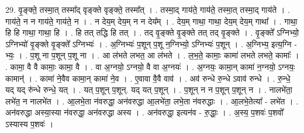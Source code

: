 \documentclass[17pt]{extarticle}
\begin{document}
29. वृ॒ङ्क्ते॒ तस्मा॒त् तस्मा᳚द् वृङ्क्ते वृङ्क्ते॒ तस्मा᳚त् । . तस्मा॒द् गाय॑ते॒ गाय॑ते॒ तस्मा॒त् तस्मा॒द् गाय॑ते । . गाय॑ते॒ न न गाय॑ते॒ गाय॑ते॒ न । . न देय॒म् देय॒म् न न देय᳚म् । . देय॒म् गाथा॒ गाथा॒ देय॒म् देय॒म् गाथा᳚ । . गाथा॒ हि हि गाथा॒ गाथा॒ हि । . हि तत् तद्धि हि तत् । . तद् वृ॒ङ्क्ते वृ॒ङ्क्ते तत् तद् वृ॒ङ्क्ते । . वृ॒ङ्क्ते᳚ ऽग्निभ्यो॒ ऽग्निभ्यो॑ वृ॒ङ्क्ते वृ॒ङ्क्ते᳚ ऽग्निभ्यः॑ । . अ॒ग्निभ्यः॑ प॒शून् प॒शू न॒ग्निभ्यो॒ ऽग्निभ्यः॑ प॒शून् । . अ॒ग्निभ्य॒ इत्य॒ग्नि - भ्यः॒ । . प॒शू ना प॒शून् प॒शू ना । . आ ल॑भते लभत॒ आ ल॑भते । . ल॒भ॒ते॒ कामाः॒ कामा॑ लभते लभते॒ कामाः᳚ । . कामा॒ वै वै कामाः॒ कामा॒ वै । . वा अ॒ग्नयो॒ ऽग्नयो॒ वै वा अ॒ग्नयः॑ । . अ॒ग्नयः॒ कामा॒न् कामा॑ न॒ग्नयो॒ ऽग्नयः॒ कामान्॑ । . कामा॑ ने॒वैव कामा॒न् कामा॑ ने॒व । . ए॒वावा वै॒वै वाव॑ । . अव॑ रुन्धे रु॒न्धे ऽवाव॑ रुन्धे । . रु॒न्धे॒ यद् यद् रु॑न्धे रुन्धे॒ यत् । . यत् प॒शून् प॒शून्. यद् यत् प॒शून् । . प॒शून् न न प॒शून् प॒शून् न । . नालभे॑ता॒ लभे॑त॒ न नालभे॑त । . आ॒लभे॒ता न॑वरुद्धा॒ अन॑वरुद्धा आ॒लभे॑ता॒ लभे॒ता न॑वरुद्धाः । . आ॒लभे॒तेत्या᳚ - लभे॑त । . अन॑वरुद्धा अस्या॒स्या न॑वरुद्धा॒ अन॑वरुद्धा अस्य । . अन॑वरुद्धा॒ इत्यन॑व - रु॒द्धाः॒ । . अ॒स्य॒ प॒शवः॑ प॒शवो᳚ ऽस्यास्य प॒शवः॑ । \newline
\end{document}
